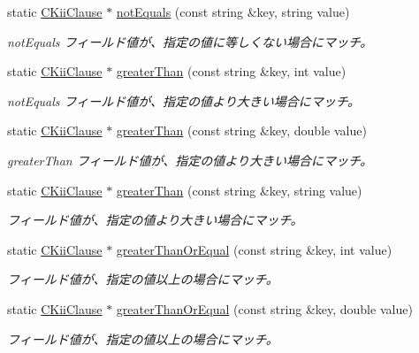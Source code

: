 \begin{DoxyCompactItemize}
static \hyperlink{class_c_kii_clause}{C\-Kii\-Clause} $\ast$ \hyperlink{class_c_kii_clause_a7c6898c4d4668cd299eaeb339dc8c149}{not\-Equals} (const string \&key, string value)
\begin{DoxyCompactList}\small\item\em not\-Equals フィールド値が、指定の値に等しくない場合にマッチ。 \end{DoxyCompactList}\item 
static \hyperlink{class_c_kii_clause}{C\-Kii\-Clause} $\ast$ \hyperlink{class_c_kii_clause_a3ee93c221afcf39a2217193e8b8521ce}{greater\-Than} (const string \&key, int value)
\begin{DoxyCompactList}\small\item\em not\-Equals フィールド値が、指定の値より大きい場合にマッチ。 \end{DoxyCompactList}\item 
static \hyperlink{class_c_kii_clause}{C\-Kii\-Clause} $\ast$ \hyperlink{class_c_kii_clause_a465c226bbbe3aa736f74dc4e4882c4a3}{greater\-Than} (const string \&key, double value)
\begin{DoxyCompactList}\small\item\em greater\-Than フィールド値が、指定の値より大きい場合にマッチ。 \end{DoxyCompactList}\item 
static \hyperlink{class_c_kii_clause}{C\-Kii\-Clause} $\ast$ \hyperlink{class_c_kii_clause_a644cd0e07ab1bce5fb0a676e284a7c23}{greater\-Than} (const string \&key, string value)
\begin{DoxyCompactList}\small\item\em フィールド値が、指定の値より大きい場合にマッチ。 \end{DoxyCompactList}\item 
static \hyperlink{class_c_kii_clause}{C\-Kii\-Clause} $\ast$ \hyperlink{class_c_kii_clause_aa9144cc687592d76da83f70b3f95c696}{greater\-Than\-Or\-Equal} (const string \&key, int value)
\begin{DoxyCompactList}\small\item\em フィールド値が、指定の値以上の場合にマッチ。 \end{DoxyCompactList}\item 
static \hyperlink{class_c_kii_clause}{C\-Kii\-Clause} $\ast$ \hyperlink{class_c_kii_clause_a92038b26eea0d39239e72ad43a12167b}{greater\-Than\-Or\-Equal} (const string \&key, double value)
\begin{DoxyCompactList}\small\item\em フィールド値が、指定の値以上の場合にマッチ。 \end{DoxyCompactList}\item 

\end{DoxyCompactItemize}
